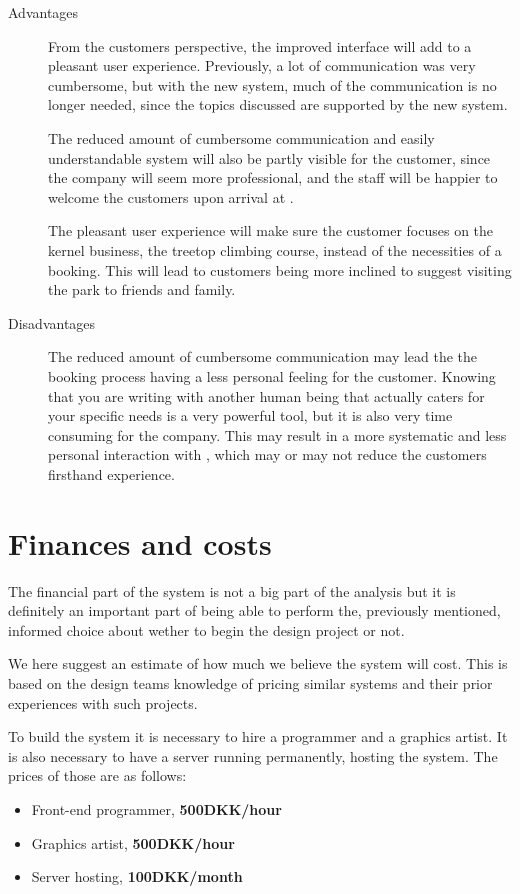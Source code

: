 \begin{description}
\item[Advantages]
From the customers perspective, the improved interface will add to a pleasant
user experience. Previously, a lot of communication was very cumbersome, but 
with the new system, much of the communication is no longer needed, since the
topics discussed are supported by the new system. 

The reduced amount of cumbersome communication and easily understandable system
will also be partly visible  for the customer, since the company will seem more
professional, and the staff will be happier to welcome the customers upon 
arrival at \gomonkey{}.

The pleasant user experience will make sure the customer focuses on the kernel
business, the treetop climbing course, instead of the necessities of a booking.
This will lead to customers being more inclined to suggest visiting the park
to friends and family. 

\item[Disadvantages]
The reduced amount of cumbersome communication may lead the the booking process having
a less personal feeling for the customer. Knowing that you are writing with
another human being that actually caters for your specific needs is a very 
powerful tool, but it is also very time consuming for the company. This may
result in a more systematic and less personal interaction with \gomonkey{}, which
may or may not reduce the customers firsthand experience.
\end{description}

\newpage
\section{Finances and costs}
The financial part of the system is not a big part of the analysis but it is
definitely an important part of being able to perform the, previously mentioned,
informed choice about wether to begin the design project or not.

We here suggest an estimate of how much we believe the system will cost. This
is based on the design teams knowledge of pricing similar systems and their 
prior experiences with such projects. 

To build the system it is necessary to hire a programmer and a graphics artist.
It is also necessary to have a server running permanently, hosting the system. 
The prices of those are as follows:

\begin{itemize}
\item Front-end programmer, \textbf{500DKK/hour}
\item Graphics artist, \textbf{500DKK/hour}
\item Server hosting, \textbf{100DKK/month}
\end{itemize}

